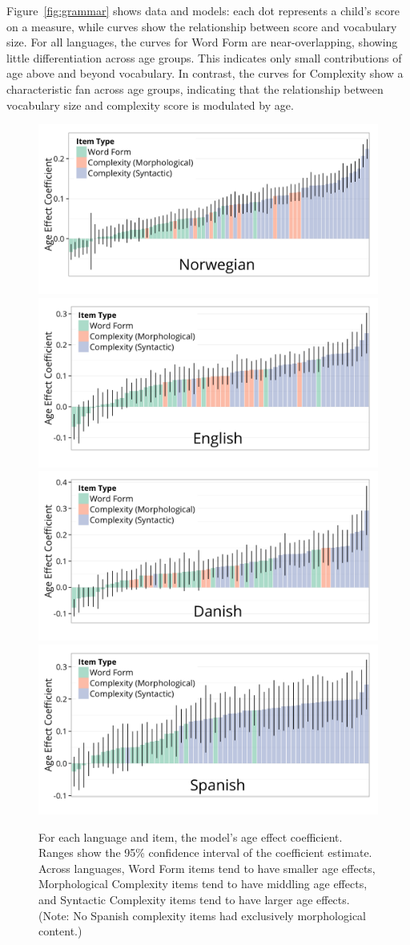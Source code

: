 \documentclass[10pt,letterpaper]{article}
\begin{document}
Figure~\ref{fig:grammar} shows data and models: each dot represents a child's score on a measure, while curves show the relationship between score and vocabulary size.
For all languages, the curves for Word Form are near-overlapping, showing little differentiation across age groups. This indicates only small contributions of age above and beyond vocabulary. In contrast, the curves for Complexity show a characteristic fan across age groups, indicating that the relationship between vocabulary size and complexity score is modulated by age. %

\begin{figure}
\centering
\includegraphics[width=.45\textwidth]{plots/item_coef_plot_norwegian-1.png}
\includegraphics[width=.45\textwidth]{plots/item_coef_plot_english-1.png}\\
\includegraphics[width=.45\textwidth]{plots/item_coef_plot_danish-1.png}
\includegraphics[width=.45\textwidth]{plots/item_coef_plot_spanish-1.png}
\caption{\label{fig:interactions} For each language and item, the model's age effect coefficient. Ranges show the 95\% confidence interval of the coefficient estimate. Across languages, Word Form items tend to have smaller age effects, Morphological Complexity items tend to have middling age effects, and Syntactic Complexity items tend to have larger age effects. (Note: No Spanish complexity items had exclusively morphological content.)}
\end{figure}
\end{document}
